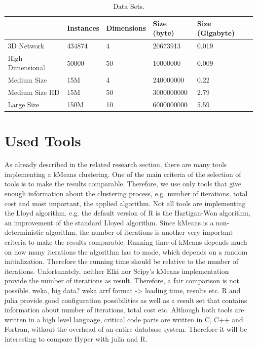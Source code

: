 \begin{table}[htsb]
  \caption[Data Sets]{Data Sets.}\label{tab:data_sets}
  \centering
  \begin{tabular}{l l l l l}
    \toprule
      & Instances & Dimensions & Size (byte) & Size (Gigabyte) \\
    \midrule
      3D Network        & 434874    & 4     & 20673913 & 0.019 \\
      High Dimensional  & 50000     & 50    & 10000000 & 0.009 \\
      Medium Size       & 15M       & 4     & 240000000 & 0.22 \\
      Medium Size HD    & 15M       & 50    & 3000000000 & 2.79 \\
      Large Size        & 150M      & 10    & 6000000000 & 5.59 \\
    \bottomrule
  \end{tabular}
\end{table}


\section{Used Tools}

As already described in the related research section, there are many tools implementing a kMeans clustering. One of the main criteria of the selection of tools is to make the results comparable. Therefore, we use only tools that give enough information about the clustering process, e.g. number of iterations, total cost and most important, the applied algorithm. Not all tools are implementing the Lloyd algorithm, e.g. the default version of R is the Hartigan-Won algorithm, an improvement of the standard Lloyed algorithm.
Since kMeans is a non-deterministic algorithm, the number of iterations is another very important criteria to make the results comparable. Running time of kMeans depends much on how many iterations the algorithm has to made, which depends on a random initialization. Therefore the running time should be relative to the number of iterations.
Unfortunately, neither Elki nor Scipy’s kMeans implementation provide the number of iterations as result. Therefore, a fair comparison is not possible.
weka, big data?
weka arrf format -> loading time, results etc.
R and julia provide good configuration possibilities as well as a result set that contains information about number of iterations, total cost etc. Although both tools are written in a high level language, critical code parts are written in C, C++ and Fortran, without the overhead of an entire database system. Therefore it will be interesting to compare Hyper with julia and R.


